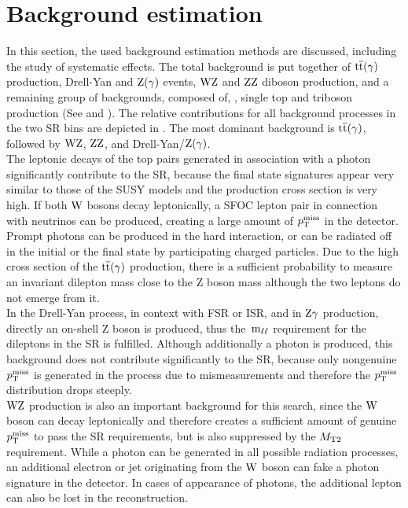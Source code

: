 \section{Background estimation}\label{sec:BKG}
In this section, the used background estimation methods are discussed, including the study of systematic effects. The total background is put together of ${\mathrm{t}\overline{\mathrm{t}}}(\gamma)$ production, Drell-Yan and $\mathrm{Z}(\gamma)$ events, $\mathrm{W}\mathrm{Z}$ and $\mathrm{Z}\mathrm{Z}$ diboson production, and a remaining group of backgrounds, composed of, \eg, single top and triboson production (See  and ). The relative contributions for all background processes in the two SR bins are depicted in . The most dominant background is ${\mathrm{t}\overline{\mathrm{t}}}(\gamma)$, followed by $\mathrm{W}\mathrm{Z}$, $\mathrm{Z}\mathrm{Z}$, and Drell-Yan/$\mathrm{Z}(\gamma)$.\\
The leptonic decays of the top pairs generated in association with a photon significantly contribute to the SR, because the final state signatures appear very similar to those of the SUSY models and the production cross section is very high. If both $\mathrm{W}$ bosons decay leptonically, a SFOC lepton pair in connection with neutrinos can be produced, creating a large amount of $p_{\mathrm{T}}^\text{miss}$ in the detector. Prompt photons can be produced in the hard interaction, or can be radiated off in the initial or the final state by participating charged particles. Due to the high cross section of the ${\mathrm{t}\overline{\mathrm{t}}}(\gamma)$ production, there is a sufficient probability to measure an invariant dilepton mass close to the Z boson mass although the two leptons do not emerge from it.\\
In the Drell-Yan process, in context with FSR or ISR, and in $\mathrm{Z}\gamma$ production, directly an on-shell Z boson is produced, thus the $\,\text{m}_{\ell\ell}$ requirement for the dileptons in the SR is fulfilled. Although additionally a photon is produced, this background does not contribute significantly to the SR, because only nongenuine $p_{\mathrm{T}}^\text{miss}$ is generated in the process due to mismeasurements and therefore the $p_{\mathrm{T}}^\text{miss}$ distribution drops steeply.\\
$\mathrm{W}\mathrm{Z}$ production is also an important background for this search, since the $\mathrm{W}$ boson can decay leptonically and therefore creates a sufficient amount of genuine $p_{\mathrm{T}}^\text{miss}$ to pass the SR requirements, but is also suppressed by the $M_{\mathrm{T2}}$ requirement. While a photon can be generated in all possible radiation processes, an additional electron or jet originating from the $\mathrm{W}$ boson can fake a photon signature in the detector. In cases of appearance of photons, the additional lepton can also be lost in the reconstruction.\\
